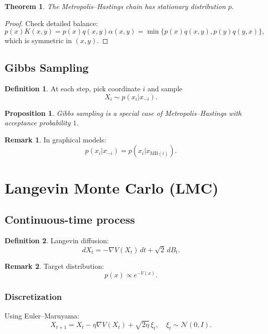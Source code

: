 \documentclass[12pt,oneside]{book}
\numberwithin{equation}{section}
\theoremstyle{definition}
\newtheorem{definition}{Definition}[section]
\newtheorem{remark}{Remark}[section]
\theoremstyle{plain}
\newtheorem{theorem}{Theorem}[section]
\newtheorem{proposition}{Proposition}[section]
\theoremstyle{remark}
\newcommand{\Normal}{\mathcal{N}}
\begin{document}
\begin{theorem}
The Metropolis--Hastings chain has stationary distribution $p$.
\end{theorem}

\begin{proof}
Check detailed balance:
\[
p(x)K(x,y)
=
p(x)q(x,y)\alpha(x,y)
=
\min\{p(x)q(x,y), p(y)q(y,x)\},
\]
which is symmetric in $(x,y)$.
\end{proof}


\subsection*{Gibbs Sampling}

\begin{definition}
At each step, pick coordinate $i$ and sample
\[
X_i \sim p(x_i | x_{-i}).
\]
\end{definition}

\begin{proposition}
Gibbs sampling is a special case of Metropolis--Hastings with acceptance probability $1$.
\end{proposition}

\begin{remark}
In graphical models:
\[
p(x_i | x_{-i}) = p(x_i | x_{\mathrm{MB}(i)}).
\]
\end{remark}


\section{Langevin Monte Carlo (LMC)}

\subsection*{Continuous-time process}

\begin{definition}
Langevin diffusion:
\[
dX_t = -\nabla V(X_t)\,dt + \sqrt{2}\,dB_t.
\]
\end{definition}

\begin{remark}
Target distribution:
\[
p(x) \propto e^{-V(x)}.
\]
\end{remark}


\subsubsection*{Discretization}

Using Euler--Maruyama:
\[
X_{t+1} = X_t - \eta \nabla V(X_t) + \sqrt{2\eta}\,\xi_t,
\quad \xi_t \sim \Normal(0,I).
\]
\end{document}
